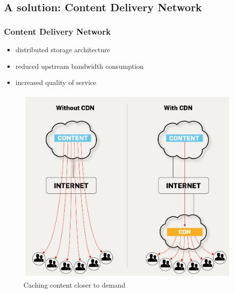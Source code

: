 \documentclass{beamer}
\begin{document}
\subsection{A solution: Content Delivery Network}
\begin{frame}
    \frametitle{Content Delivery Network}

    \begin{itemize}
        \item distributed storage architecture
        \item reduced upstream bandwidth consumption
        \item increased quality of service
    \end{itemize}
    \begin{figure}
    \includegraphics[height=0.6\textheight]{cdn_or_not.png}
    \caption{Caching content closer to demand}
    \end{figure}

\end{frame}
\end{document}
